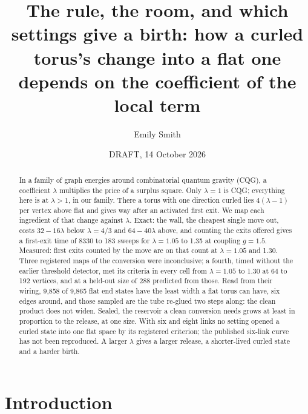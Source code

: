 \documentclass[aps,pre,10pt,twocolumn,superscriptaddress,nofootinbib]{revtex4-2}
\begin{document}
\title{The rule, the room, and which settings give a birth: how a curled torus's change into a flat one depends
on the coefficient of the local term}

\author{Emily Smith}

\date{DRAFT, 14 October 2026}

\begin{abstract}
In a family of graph energies around combinatorial quantum gravity (CQG), a coefficient $\lambda$ multiplies the
price of a surplus square. Only $\lambda=1$ is CQG; everything here is at $\lambda>1$, in our family. There a torus with
one direction curled lies $4(\lambda-1)$ per vertex above flat and gives way after an activated first exit. We map each ingredient of that change against $\lambda$.
Exact: the wall, the cheapest single move out, costs $32-16\lambda$ below $\lambda=4/3$ and $64-40\lambda$ above,
and counting the exits offered gives a first-exit time of 8330 to 183 sweeps for $\lambda=1.05$ to 1.35 at
coupling $g=1.5$. Measured: first exits counted by the move are on that count at $\lambda=1.05$ and 1.30. Three
registered maps of the conversion were inconclusive; a fourth, timed without the earlier threshold detector,
met its criteria in every cell from $\lambda=1.05$ to 1.30 at 64 to 192 vertices, and at a held-out size of 288
predicted from those. Read from their wiring, 9,858 of 9,865 flat end states have the least width a flat torus
can have, six edges around, and those sampled are the tube re-glued two steps along: the clean product does not
widen. Sealed, the reservoir a clean conversion needs grows at least in proportion to the release, at one size.
With six and eight links no setting opened a curled state into one flat space by its registered criterion; the
published six-link curve has not been reproduced. A larger $\lambda$ gives a larger release, a shorter-lived curled state and a harder birth.
\end{abstract}

\maketitle

\section{Introduction}
\end{document}
